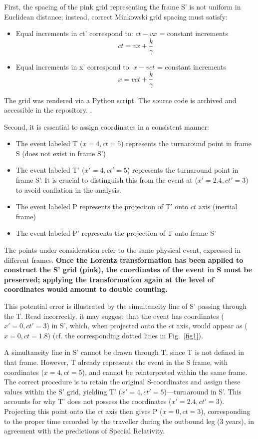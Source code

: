 \documentclass[pdflatex,sn-basic]{sn-jnl}
\theoremstyle{thmstyleone}%
\theoremstyle{thmstyletwo}%
\theoremstyle{thmstylethree}%
\begin{document}
  First, the spacing of the pink grid representing the frame S' is not uniform in Euclidean distance; instead, correct Minkowski grid spacing must satisfy:
		\begin{itemize}
			\item Equal increments in ct' correspond to: $ct-vx$ = constant increments
				\begin{equation*}
					ct = vx + \frac{k}{\gamma}
				\end{equation*}
			\item Equal increments in x' correspond to: $x-vct$ = constant increments
				\begin{equation*}
					x = vct + \frac{k}{\gamma}
				\end{equation*}
		\end{itemize}
The grid was rendered via a Python script. The source code is archived and accessible in the repository. \cite{time_duration_code2026}.

Second, it is essential to assign coordinates in a consistent manner:
		\begin{itemize}
			\item The event labeled T ($x = 4, ct = 5$) represents the turnaround point in frame S (does not exist in frame S')
			\item The event labeled T' ($x' = 4, ct'  = 5$) represents the turnaround point in frame S'. It is crucial to distinguish this from the event at ($x' = 2.4, ct' = 3$) to avoid conflation in the analysis.
			\item The event labeled P represents the projection of T' onto $ct$ axis (inertial frame)
			\item The event labeled P' represents the projection of T onto frame S'
		\end{itemize}
The points under consideration refer to the same physical event, expressed in different frames. \textbf{Once the Lorentz transformation has been applied to construct the S' grid (pink), the coordinates of the event in S must be preserved; applying the transformation again at the level of coordinates would amount to double counting.}

This potential error is illustrated by the simultaneity line of S' passing through the T. Read incorrectly, it may suggest that the event has coordinates ($x' = 0, ct' =3$) in S', which, when projected onto the $ct$ axis, would appear as ($x = 0, ct = 1.8$) (cf. the corresponding dotted lines in Fig.~\ref{fig1}). 

A simultaneity line in S' cannot be drawn through T, since T is not defined in that frame. However, T already represents the event in the S frame, with coordinates ($x = 4, ct = 5$), and cannot be reinterpreted within the same frame. The correct procedure is to retain the original S-coordinates and assign these values within the S' grid, yielding T' ($x' = 4, ct' = 5$)—turnaround in S'. This accounts for why T' does not possess the coordinates ($x' = 2.4, ct' = 3$). Projecting this point onto the $ct$ axis then gives P ($x = 0, ct = 3$), corresponding to the proper time recorded by the traveller during the outbound leg (3 years), in agreement with the predictions of Special Relativity.
\end{document}
